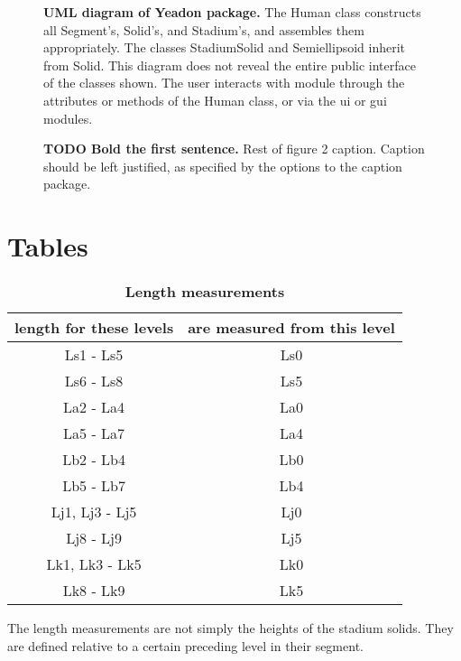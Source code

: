 \documentclass[10pt]{article}
\begin{document}
\begin{figure}[!ht]
\begin{center}
\end{center}
\caption{
{\bf UML diagram of Yeadon package.}  The Human class constructs all
Segment's, Solid's, and Stadium's, and assembles them
appropriately. The classes StadiumSolid and Semiellipsoid inherit
from Solid. This diagram does not reveal the entire public interface of
the classes shown. The user interacts with module through the attributes or
methods of the Human class, or via the ui or gui modules.
}
\label{fig:umldiagram}
\end{figure}

\begin{figure}[!ht]
\begin{center}
\end{center}
\caption{
{\bf TODO Bold the first sentence.}  Rest of figure 2  caption.  Caption 
should be left justified, as specified by the options to the caption 
package.
}
\label{fig:iceskater}
\end{figure}

\section*{Tables}

\begin{table}[!ht]
\caption{
\bf{Length measurements}}
\begin{tabular}{|c|c|}
    \hline
    \textbf{length for these levels} & \textbf{are measured from this level}\\
    \hline
    Ls1 - Ls5 & Ls0 \\
    \hline
    Ls6 - Ls8 & Ls5 \\
    \hline
    La2 - La4 & La0 \\
    \hline
    La5 - La7 & La4 \\
    \hline
    Lb2 - Lb4 & Lb0 \\
    \hline
    Lb5 - Lb7 & Lb4 \\
    \hline
    Lj1, Lj3 - Lj5 & Lj0 \\
    \hline
    Lj8 - Lj9 & Lj5  \\
    \hline
    Lk1, Lk3 - Lk5 & Lk0 \\
    \hline
    Lk8 - Lk9 & Lk5  \\
    \hline
\end{tabular}
\begin{flushleft}The length measurements are not simply the heights of the
    stadium solids. They are defined relative to a certain preceding level in
    their segment.
\end{flushleft}
\label{tab:length}
\end{table}
\end{document}
